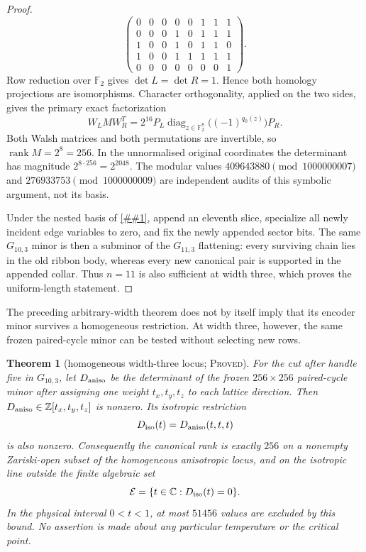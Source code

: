\documentclass[11pt]{article}
\newcommand{\cref}[1]{\autoref{##1}}%
\newtheorem{theorem}{Theorem}[section]
\newcommand{\Ftwo}{\mathbb F_2}
\newcommand{\rank}{\operatorname{rank}}
\newcommand{\claimtag}[1]{\textsc{#1}}
\newcommand{\proved}{\claimtag{Proved}}
\begin{document}
\begin{proof}
\[\begin{pmatrix}
0&0&0&0&0&1&1&1\\0&0&0&1&0&1&1&1\\1&0&0&1&0&1&1&0\\
1&0&0&1&1&1&1&1\\0&0&0&0&0&0&0&1
\end{pmatrix}.
\]
Row reduction over \(\Ftwo\) gives
\(\det L=\det R=1\).  Hence both homology projections are isomorphisms.
Character orthogonality, applied on the two sides, gives the primary exact
factorization
\[
 W_LMW_R^T
 =2^{16}P_L\operatorname{diag}_{z\in\Ftwo^8}
       \bigl((-1)^{q_0(z)}\bigr)P_R .
\]
Both Walsh matrices and both permutations are invertible, so
\(\rank M=2^8=256\).  In the unnormalised original coordinates the
determinant has magnitude \(2^{8\cdot256}=2^{2048}\).  The modular values
\(409643880\pmod {1000000007}\) and
\(276933753\pmod {1000000009}\) are independent audits of this symbolic
argument, not its basis.

Under
the nested basis of \cref{lem:canonical}, append an eleventh slice, specialize
all newly incident edge variables to zero, and fix the newly appended sector
bits.  The same \(G_{10,3}\) minor is then a subminor of the \(G_{11,3}\)
flattening: every surviving chain lies in the old ribbon body, whereas every
new canonical pair is supported in the appended collar.  Thus \(n=11\) is
also sufficient at width three, which proves the uniform-length statement.
\end{proof}

The preceding arbitrary-width theorem does not by itself imply that its
encoder minor survives a homogeneous restriction.  At width three, however,
the same frozen paired-cycle minor can be tested without selecting new rows.

\begin{theorem}[homogeneous width-three locus; \proved]
\label{thm:w3-homogeneous}
For the cut after handle five in \(G_{10,3}\), let \(D_{\rm aniso}\) be the
determinant of the frozen \(256\times256\) paired-cycle minor after assigning
one weight \(t_x,t_y,t_z\) to each lattice direction.  Then
\(D_{\rm aniso}\in\mathbb Z[t_x,t_y,t_z]\) is nonzero.  Its isotropic
restriction
\[
 D_{\rm iso}(t)=D_{\rm aniso}(t,t,t)
\]
is also nonzero.  Consequently the canonical rank is exactly \(256\) on a
nonempty Zariski-open subset of the homogeneous anisotropic locus, and on the
isotropic line outside the finite algebraic set
\[
 \mathcal E=\{t\in\mathbb C:D_{\rm iso}(t)=0\}.
\]
In the physical interval \(0<t<1\), at most \(51456\) values are excluded by
this bound.  No assertion is made about any particular temperature or the
critical point.
\end{theorem}
\end{document}
